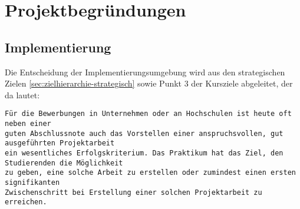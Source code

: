 \chapter{Projektbegründungen}

\begin{comment}
Die Projektbegründungen sind jene Begründungen, die Bezug nehmen auf jegliche Entscheidungen, die im Projekt getroffen werden. Es sind somit projektspezifische Begründungen. Darin sollten Alternativen abgewägt werden und Inhalte auf den Punkt gebracht werden, sodass "Totes Wissen" eliminiert wird. Ein roter Faden sollte ersichtlich sein. Als Referenz dienen jeweilige Artefakte, die in dem Projekt entwickelt worden sind und demnach begründet werden müssen. 
\end{comment}



\section{Implementierung}

Die Entscheidung der Implementierungsumgebung wird aus den strategischen Zielen \ref{sec:zielhierarchie-strategisch}
sowie Punkt 3 der Kursziele abgeleitet, der da lautet:
\begin{verbatim}
Für die Bewerbungen in Unternehmen oder an Hochschulen ist heute oft neben einer 
guten Abschlussnote auch das Vorstellen einer anspruchsvollen, gut ausgeführten Projektarbeit 
ein wesentliches Erfolgskriterium. Das Praktikum hat das Ziel, den Studierenden die Möglichkeit 
zu geben, eine solche Arbeit zu erstellen oder zumindest einen ersten signifikanten 
Zwischenschritt bei Erstellung einer solchen Projektarbeit zu erreichen.
\end{verbatim}
\noindent
\begin{comment}
Ausgangszustand: aktuelle Situation des Teilnehmenden\\
Zielzustand: Punkte 1, 2 und 3 der Kurszielsetzung 
Erfolg: Evaluation des Projektes anhand des Erfüllungsgrades der Kursziele\\
Punkt 3 der Kursziele lässt sich als Schnittstelle des Teilnehmers zu potentiellen Arbeitgebern
definieren an welche der Kursteilnehmer die Parameter seiner Fähigkeiten an den Arbeitgeber übergibt, 
diese auf Kompatibilität geprüft werden und bei hinreichender Übereinstimmung eine Zusammenarbeit zustande kommt.\\
\end{comment}

